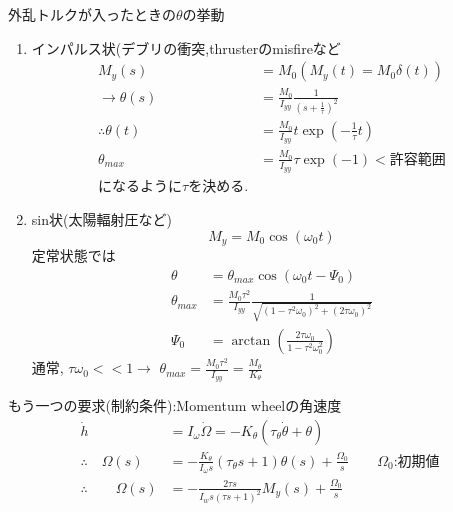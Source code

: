 \documentclass[class=article, crop=false, dvipdfmx]{standalone}
\begin{document}
外乱トルクが入ったときの$\theta$の挙動
\begin{enumerate}
\item{インパルス状(デブリの衝突,thrusterのmisfireなど}
\begin{align}
M_y(s) &= M_0 (M_y(t) = M_0 \delta(t))\\
\rightarrow 
\theta(s) &= \frac{M_0}{I_{yy}}
\frac{1}{(s+\frac{1}{\tau})^2}\\
\therefore 
\theta(t) &= \frac{M_0}{I_{yy}} 
t
\exp(-\frac{1}{\tau} t)\\
\theta_{max} &= \frac{M_0}{I_{yy}}\tau \exp(-1) 
<\mbox{許容範囲}\\
\mbox{になるように}\tau\mbox{を決める.}
\end{align}
\item{sin状(太陽輻射圧など)}
\begin{equation}
M_y=M_0 \cos(\omega_0 t)
\end{equation}
定常状態では
\begin{align}
\theta &= \theta_{max} \cos(\omega_0 t - \Psi_0)\\
\theta_{max} &= \frac{M_0 \tau^2}{I_{yy}}
\frac{1}
{\sqrt{(1-\tau^2 \omega_0)^2
+(2\tau \omega_0)^2}}\\
\Psi_0 &= \arctan(\frac{2\tau \omega_0}{1- \tau^2 \omega_0^2})
\end{align}
通常,
$\tau \omega_0<< 1\rightarrow$
$\theta_{max} = \frac{M_0 \tau^2}{I_{yy}} = \frac{M_{\theta}}{K_\theta}$
\end{enumerate}
もう一つの要求(制約条件):Momentum wheelの角速度
\begin{align}
\dot{h}&=
I_{\omega}\dot{\Omega}=
-K_\theta (\tau_\theta \dot{\theta} + \theta)\\
\therefore \quad \Omega (s)&=
-\frac{K_\theta}{I_\omega s}(\tau_\theta s+1)
\theta (s)+\frac{\Omega_0}{s}
\qquad \Omega_0\text{:初期値}\\
\therefore \qquad \Omega (s)&=
-\frac{2\tau s}{I_w s(\tau s+1)^2}
M_y(s)+\frac{\Omega_0}{s}
\end{align}
\end{document}
